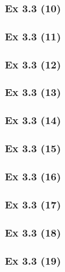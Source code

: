 \subsubsection{Ex 3.3 (10)}\label{sec:Ex_3.3.10}

\newpage		%

\subsubsection{Ex 3.3 (11)}\label{sec:Ex_3.3.11}

\subsubsection{Ex 3.3 (12)}\label{sec:Ex_3.3.12}

\subsubsection{Ex 3.3 (13)}\label{sec:Ex_3.3.13}

\subsubsection{Ex 3.3 (14)}\label{sec:Ex_3.3.14}

\subsubsection{Ex 3.3 (15)}\label{sec:Ex_3.3.15}

\subsubsection{Ex 3.3 (16)}\label{sec:Ex_3.3.16}

\subsubsection{Ex 3.3 (17)}\label{sec:Ex_3.3.17}

\subsubsection{Ex 3.3 (18)}\label{sec:Ex_3.3.18}

\subsubsection{Ex 3.3 (19)}\label{sec:Ex_3.3.19}

